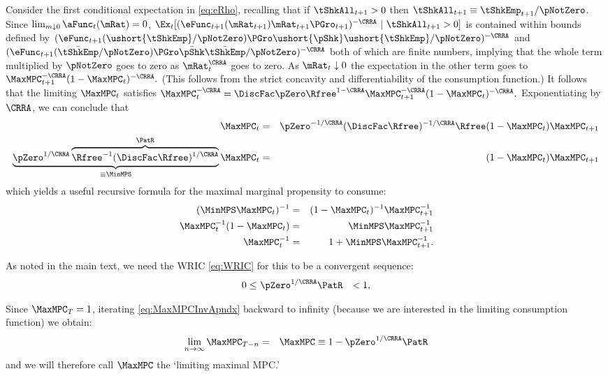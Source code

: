 \documentclass[../BufferStockTheory.tex]{subfiles}
\begin{document}
Consider the first conditional expectation in \eqref{eq:eRho},
recalling that if $\tShkAll_{t+1}>0$ then $\tShkAll_{t+1} \equiv
\tShkEmp_{t+1}/\pNotZero$.  Since $\lim_{m \downarrow 0}
\aFunc_{t}(\mRat) = 0$,
$\Ex_{t}[(\eFunc_{t+1}(\mRat_{t+1})\mRat_{t+1}\PGro_{t+1})^{-\CRRA}~|~\tShkAll_{t+1}>0]$
is contained within bounds defined by
$(\eFunc_{t+1}(\ushort{\tShkEmp}/\pNotZero) \PGro\ushort{\pShk}
\ushort{\tShkEmp}/\pNotZero)^{-\CRRA}$ and
$(\eFunc_{t+1}(\bar{\tShkEmp}/\pNotZero) \PGro\bar{\pShk}
\bar{\tShkEmp}/\pNotZero)^{-\CRRA}$ both of which are finite numbers,
implying that the whole term multiplied by $\pNotZero$ goes to zero as
$\mRat_{t}^{\CRRA}$ goes to zero.  As $\mRat_{t} \downarrow 0$ the
expectation in the other term goes to $\MaxMPC _{t+1}^{-\CRRA
}(1-\MaxMPC _{t})^{-\CRRA }.$ (This follows from the strict concavity
and differentiability of the consumption function.) It follows that
the limiting $\MaxMPC_{t}$ satisfies $\MaxMPC_{t}^{-\CRRA }=\DiscFac
\pZero\Rfree^{1-\CRRA }\MaxMPC_{t+1}^{-\CRRA }(1-\MaxMPC
_{t})^{-\CRRA }.$ Exponentiating by $\CRRA$, we can conclude that
\begin{eqnarray}
\MaxMPC_{t}&=&\pZero^{-1/\CRRA} (\DiscFac
\Rfree)^{-1/\CRRA}\Rfree(1-\MaxMPC _{t})\MaxMPC _{t+1} \notag
\\ \underbrace{\pZero^{1/\CRRA}\overbrace{{\Rfree}^{-1}(\DiscFac
    \Rfree)^{1/\CRRA}}^{\PatR}}_{\equiv \MinMPS}
\MaxMPC_{t}&=&(1-\MaxMPC _{t})\MaxMPC _{t+1} \label{eq:MinMPSDef}
\end{eqnarray}
which yields a useful recursive formula for the maximal marginal propensity to consume:
\begin{eqnarray}
  (\MinMPS \MaxMPC_{t})^{-1} & = & (1-\MaxMPC_{t})^{-1}\MaxMPC_{t+1}^{-1}  \notag
\\ \MaxMPC_{t}^{-1}(1-\MaxMPC_{t}) & = & \MinMPS \MaxMPC_{t+1}^{-1} \label{eq:muDiff} \notag
\\ \MaxMPC_{t}^{-1} & = & 1+\MinMPS \MaxMPC_{t+1}^{-1} \label{eq:MaxMPCInvApndx}.
\end{eqnarray}

As noted in the main text, we need the WRIC \eqref{eq:WRIC} for this to be a convergent sequence:
\begin{eqnarray}
  0 \leq & ~\pZero^{1/\CRRA} \PatR & < 1 \label{eq:WRICapndx},
\end{eqnarray}

Since $\MaxMPC_{T}=1$, iterating \eqref{eq:MaxMPCInvApndx} backward to
infinity (because we are interested in the limiting consumption function) we obtain:
\begin{eqnarray}
\lim_{n\rightarrow\infty}\MaxMPC_{T-n} & = &
\MaxMPC \equiv 1-\pZero^{1/\CRRA}\PatR  \label{eq:MaxMPCDef}
\end{eqnarray}
and we will therefore call $\MaxMPC$ the `limiting maximal MPC.'
\end{document}
